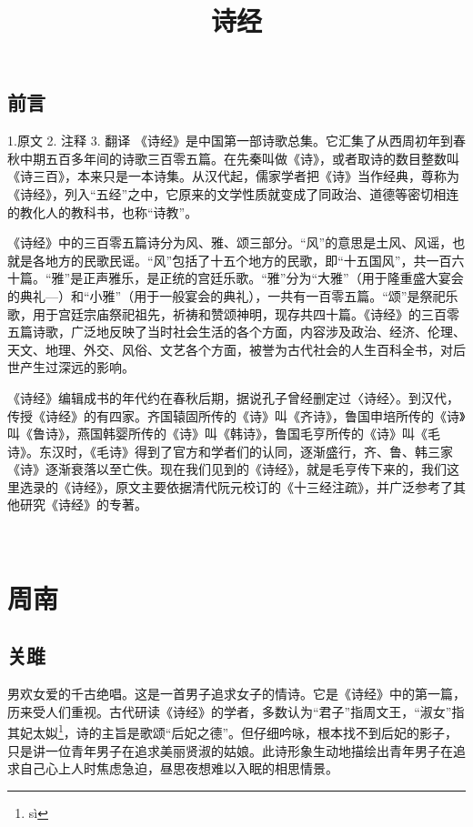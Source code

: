 \documentclass[12pt,UTF8]{ctexbook}
\title{\heiti\zihao{0} 诗经}
\author{}
\date{}
\begin{document}
\maketitle
\tableofcontents

\frontmatter
\chapter{前言}

1.原文
2. 注释
3. 翻译
《诗经》是中国第一部诗歌总集。它汇集了从西周初年到春秋中期五百多年间的诗歌三百零五篇。在先秦叫做《诗》，或者取诗的数目整数叫《诗三百》，本来只是一本诗集。从汉代起，儒家学者把《诗》当作经典，尊称为《诗经》，列入“五经”之中，它原来的文学性质就变成了同政治、道德等密切相连的教化人的教科书，也称“诗教”。

《诗经》中的三百零五篇诗分为风、雅、颂三部分。“风”的意思是土风、风谣，也就是各地方的民歌民谣。“风”包括了十五个地方的民歌，即“十五国风”，共一百六十篇。“雅”是正声雅乐，是正统的宫廷乐歌。“雅”分为“大雅”（用于隆重盛大宴会的典礼—）和“小雅”（用于一般宴会的典礼），一共有一百零五篇。“颂”是祭祀乐歌，用于宫廷宗庙祭祀祖先，祈祷和赞颂神明，现存共四十篇。《诗经》的三百零五篇诗歌，广泛地反映了当时社会生活的各个方面，内容涉及政治、经济、伦理、天文、地理、外交、风俗、文艺各个方面，被誉为古代社会的人生百科全书，对后世产生过深远的影响。

《诗经》编辑成书的年代约在春秋后期，据说孔子曾经删定过〈诗经〉。到汉代，传授《诗经》的有四家。齐国辕固所传的《诗》叫《齐诗》，鲁国申培所传的《诗》叫《鲁诗》，燕国韩婴所传的《诗》叫《韩诗》，鲁国毛亨所传的《诗》叫《毛诗》。东汉时，《毛诗》得到了官方和学者们的认同，逐渐盛行，齐、鲁、韩三家《诗》逐渐衰落以至亡佚。现在我们见到的《诗经》，就是毛亨传下来的，我们这里选录的《诗经》，原文主要依据清代阮元校订的《十三经注疏》，并广泛参考了其他研究《诗经》的专著。

\mainmatter

~\\

 \qquad  

\part{周南}

\chapter{关雎}

男欢女爱的千古绝唱。这是一首男子追求女子的情诗。它是《诗经》中的第一篇，历来受人们重视。古代研读《诗经》的学者，多数认为“君子”指周文王，“淑女”指其妃太姒\footnote{s\`i}，诗的主旨是歌颂“后妃之德”。但仔细吟咏，根本找不到后妃的影子，只是讲一位青年男子在追求美丽贤淑的姑娘。此诗形象生动地描绘出青年男子在追求自己心上人时焦虑急迫，昼思夜想难以入眠的相思情景。
\end{document}
